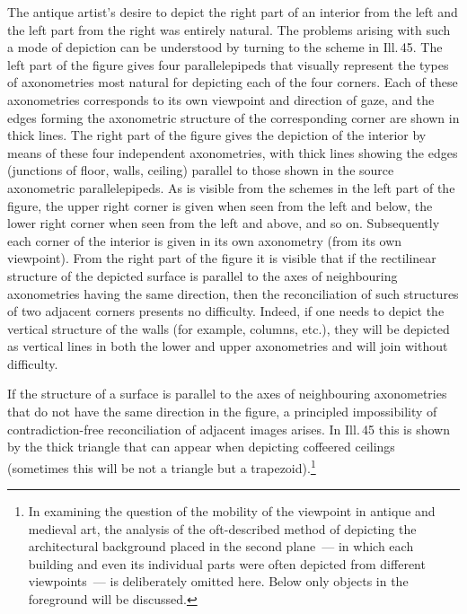 The antique artist's desire to depict the right part of an interior from the left and
the left part from the right was entirely natural.  The problems arising with such a
mode of depiction can be understood by turning to the scheme in Ill.\,45.  The left
part of the figure gives four parallelepipeds that visually represent the types of
axonometries most natural for depicting each of the four corners.  Each of these
axonometries corresponds to its own viewpoint and direction of gaze, and the edges
forming the axonometric structure of the corresponding corner are shown in thick
lines.  The right part of the figure gives the depiction of the interior by means of
these four independent axonometries, with thick lines showing the edges (junctions of
floor, walls, ceiling) parallel to those shown in the source axonometric
parallelepipeds.  As is visible from the schemes in the left part of the figure, the
upper right corner is given when seen from the left and below, the lower right corner
when seen from the left and above, and so on.  Subsequently each corner of the
interior is given in its own axonometry (from its own viewpoint).  From the right
part of the figure it is visible that if the rectilinear structure of the depicted
surface is parallel to the axes of neighbouring axonometries having the same
direction, then the reconciliation of such structures of two adjacent corners presents
no difficulty.  Indeed, if one needs to depict the vertical structure of the walls
(for example, columns, etc.), they will be depicted as vertical lines in both the
lower and upper axonometries and will join without difficulty.


If the structure of a surface is parallel to the axes of neighbouring axonometries
that do not have the same direction in the figure, a principled impossibility of
contradiction-free reconciliation of adjacent images arises.  In Ill.\,45 this is
shown by the thick triangle that can appear when depicting coffeered ceilings
(sometimes this will be not a triangle but a trapezoid).\footnote{In examining the
  question of the mobility of the viewpoint in antique and medieval art, the analysis
  of the oft-described method of depicting the architectural background placed in the
  second plane~--- in which each building and even its individual parts were often
  depicted from different viewpoints~--- is deliberately omitted here.  Below only
  objects in the foreground will be discussed.}

